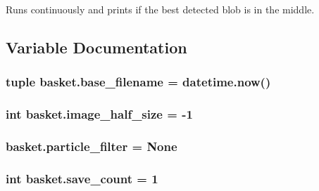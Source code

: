 Runs continuously and prints if the best detected blob is in the middle. 



\subsection{Variable Documentation}
\subsubsection[{base\+\_\+filename}]{\setlength{\rightskip}{0pt plus 5cm}tuple basket.\+base\+\_\+filename = datetime.\+now()}\label{namespacebasket_aa3007fa12430ca814f5bf5890bb2fb0f}
\subsubsection[{image\+\_\+half\+\_\+size}]{\setlength{\rightskip}{0pt plus 5cm}int basket.\+image\+\_\+half\+\_\+size = -\/1}\label{namespacebasket_a3c352b285b29250f904de2d4ad7fddaa}
\subsubsection[{particle\+\_\+filter}]{\setlength{\rightskip}{0pt plus 5cm}basket.\+particle\+\_\+filter = None}\label{namespacebasket_ae8e523df739d65470eb5eba16867f329}
\subsubsection[{save\+\_\+count}]{\setlength{\rightskip}{0pt plus 5cm}int basket.\+save\+\_\+count = 1}\label{namespacebasket_a3d020674941ec4faf6734391ca082c40}

